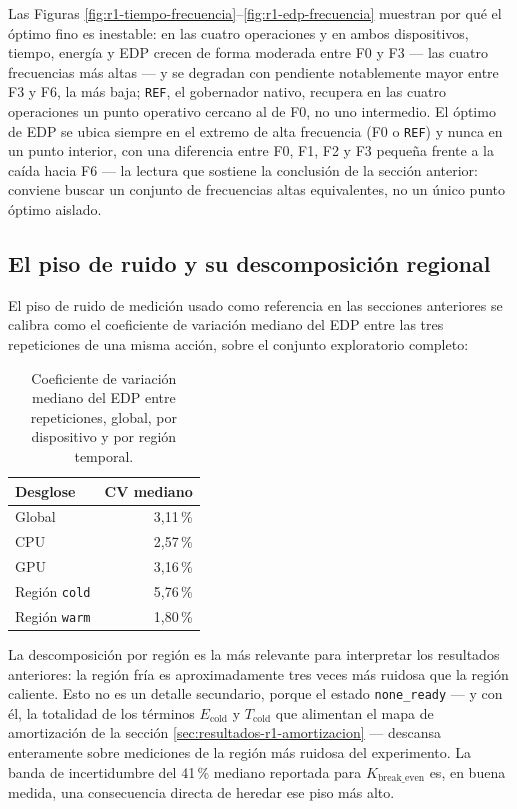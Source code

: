 \documentclass[12pt,oneside,spanish]{book}
\begin{document}
Las Figuras \ref{fig:r1-tiempo-frecuencia}--\ref{fig:r1-edp-frecuencia} muestran por qué el óptimo fino es inestable: en las cuatro operaciones y en ambos dispositivos, tiempo, energía y EDP crecen de forma moderada entre F0 y F3 --- las cuatro frecuencias más altas --- y se degradan con pendiente notablemente mayor entre F3 y F6, la más baja; \texttt{REF}, el gobernador nativo, recupera en las cuatro operaciones un punto operativo cercano al de F0, no uno intermedio. El óptimo de EDP se ubica siempre en el extremo de alta frecuencia (F0 o \texttt{REF}) y nunca en un punto interior, con una diferencia entre F0, F1, F2 y F3 pequeña frente a la caída hacia F6 --- la lectura que sostiene la conclusión de la sección anterior: conviene buscar un conjunto de frecuencias altas equivalentes, no un único punto óptimo aislado.

\subsection{El piso de ruido y su descomposición regional}
\label{sec:resultados-r1-piso-ruido}

El piso de ruido de medición usado como referencia en las secciones anteriores se calibra como el coeficiente de variación mediano del EDP entre las tres repeticiones de una misma acción, sobre el conjunto exploratorio completo:

\begin{table}[H]
\centering
\caption[Piso de ruido de medición, global y por región]{Coeficiente de variación mediano del EDP entre repeticiones, global, por dispositivo y por región temporal.}
\label{tab:r1-piso-ruido}
\begin{tabular}{lr}
\toprule
\textbf{Desglose} & \textbf{CV mediano} \\
\midrule
Global            & 3,11\,\% \\
CPU               & 2,57\,\% \\
GPU               & 3,16\,\% \\
Región \texttt{cold} & 5,76\,\% \\
Región \texttt{warm} & 1,80\,\% \\
\bottomrule
\end{tabular}
\end{table}

La descomposición por región es la más relevante para interpretar los resultados anteriores: la región fría es aproximadamente tres veces más ruidosa que la región caliente. Esto no es un detalle secundario, porque el estado \texttt{none\_ready} --- y con él, la totalidad de los términos $E_{\text{cold}}$ y $T_{\text{cold}}$ que alimentan el mapa de amortización de la sección \ref{sec:resultados-r1-amortizacion} --- descansa enteramente sobre mediciones de la región más ruidosa del experimento. La banda de incertidumbre del 41\,\% mediano reportada para $K_{\text{break\_even}}$ es, en buena medida, una consecuencia directa de heredar ese piso más alto.
\end{document}
